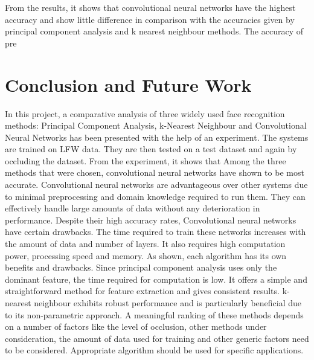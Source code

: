 \documentclass[conference]{IEEEtran}
\begin{document}
From the results, it shows that convolutional neural networks have the highest accuracy and show little difference in comparison with the accuracies given by principal component analysis and k nearest neighbour methods. The accuracy of pre

\section{Conclusion and Future Work}
\label{sec: 6.Conclusion and Future Work}

In this project, a comparative analysis of three widely used face recognition methods: Principal Component Analysis, k-Nearest Neighbour and Convolutional Neural Networks has been presented with the help of an experiment. The systems are trained on LFW data. They are then tested on a test dataset and again by occluding the dataset. From the experiment, it shows that Among the three methods that were chosen, convolutional neural networks have shown to be most accurate. Convolutional neural networks are advantageous over other systems due to minimal preprocessing and domain knowledge required to run them. They can effectively handle large amounts of data without any deterioration in performance. Despite their high accuracy rates, Convolutional neural networks have certain drawbacks. The time required to train these networks increases with the amount of data and number of layers. It also requires high computation power, processing speed and memory. As shown, each algorithm has its own benefits and drawbacks. Since principal component analysis uses only the dominant feature, the time required for computation is low. It offers a simple and straightforward method for feature extraction and gives consistent results. k-nearest neighbour exhibits robust performance and is particularly beneficial due to its non-parametric approach. A meaningful ranking of these methods depends on a number of factors like the level of occlusion, other methods under consideration, the amount of data used for training and other generic factors need to be considered. Appropriate algorithm should be used for specific applications. 
\end{document}
